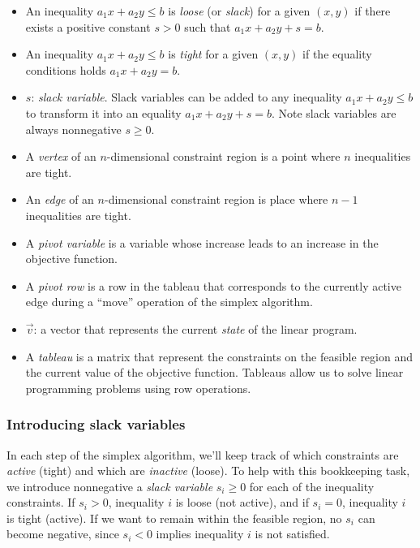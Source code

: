 \documentclass[11pt,oneside]{article}
\begin{document}
		\begin{itemize}
			\item An inequality $a_1x+a_2y \leq b$ is \emph{loose} (or \emph{slack}) for a given $(x,y)$ 
				if there exists a positive constant $s >0$ such that $a_1x+a_2y +s = b$. 
			\item An inequality $a_1x+a_2y \leq b$ is \emph{tight} for a given $(x,y)$ if the equality conditions holds $a_1x+a_2y = b$.
			\item  $s$: \emph{slack variable}. Slack variables can be added to any inequality $a_1x+a_2y \leq b$ 
				to transform it into an equality $a_1x+a_2y +s =b$. Note slack variables are always nonnegative $s \geq 0$.
			\item A \emph{vertex}   of an $n$-dimensional constraint region is a point where $n$ inequalities are tight.

			\item An \emph{edge} of an $n$-dimensional constraint region is place where $n-1$ inequalities are tight.
			\item	A \emph{pivot variable} is a variable whose increase leads to an increase in the objective function.
			\item	A \emph{pivot row} is a row in the tableau that corresponds to the currently active edge during 
				a ``move'' operation of the simplex algorithm.
			\item $\vec{v}$: a vector that represents the current \emph{state} of the linear program.
			\item A \emph{tableau} is a matrix that represent the constraints on the feasible region 
				and the current value of the objective function.
				Tableaus allow us to solve linear programming problems using row operations.
		\end{itemize}
	
	
	\subsubsection{Introducing slack variables}
	
		In each step of the simplex algorithm,
		we'll keep track of which constraints are \emph{active} (tight) and which are \emph{inactive} (loose).
		To help with this bookkeeping task,
		we introduce nonnegative a \emph{slack variable} $s_i \geq 0$ for each of the inequality constraints.
		If $s_i > 0$, inequality $i$ is loose (not active),
		and if $s_i=0$, inequality $i$ is tight (active).
		If we want to remain within the feasible region, 
		no $s_i$ can become negative, 
		since $s_i< 0$ implies inequality $i$ is not satisfied.
		
\end{document}
